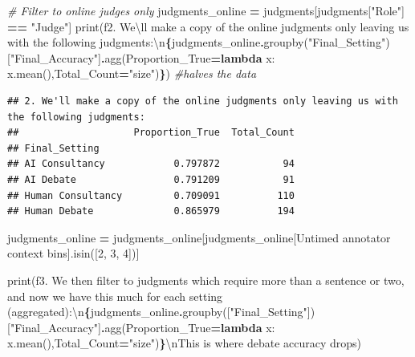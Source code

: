 \documentclass[
]{article}
\newenvironment{Shaded}{\begin{snugshade}}{\end{snugshade}}
\newcommand{\BuiltInTok}[1]{#1}
\newcommand{\CharTok}[1]{\textcolor[rgb]{0.31,0.60,0.02}{#1}}
\newcommand{\CommentTok}[1]{\textcolor[rgb]{0.56,0.35,0.01}{\textit{#1}}}
\newcommand{\KeywordTok}[1]{\textcolor[rgb]{0.13,0.29,0.53}{\textbf{#1}}}
\newcommand{\NormalTok}[1]{#1}
\newcommand{\OperatorTok}[1]{\textcolor[rgb]{0.81,0.36,0.00}{\textbf{#1}}}
\newcommand{\SpecialCharTok}[1]{\textcolor[rgb]{0.81,0.36,0.00}{\textbf{#1}}}
\newcommand{\SpecialStringTok}[1]{\textcolor[rgb]{0.31,0.60,0.02}{#1}}
\newcommand{\StringTok}[1]{\textcolor[rgb]{0.31,0.60,0.02}{#1}}
\begin{document}
\begin{Shaded}
\begin{Highlighting}[]
\CommentTok{\# Filter to online judges only}
\NormalTok{judgments\_online }\OperatorTok{=}\NormalTok{ judgments[judgments[}\StringTok{"Role"}\NormalTok{] }\OperatorTok{==} \StringTok{"Judge"}\NormalTok{]}
\BuiltInTok{print}\NormalTok{(}\SpecialStringTok{f\textquotesingle{}2. We}\CharTok{\textbackslash{}\textquotesingle{}}\SpecialStringTok{ll make a copy of the online judgments only leaving us with the following judgments:}\CharTok{\textbackslash{}n}\SpecialCharTok{\{}\NormalTok{judgments\_online}\SpecialCharTok{.}\NormalTok{groupby(}\StringTok{"Final\_Setting"}\NormalTok{)[}\StringTok{"Final\_Accuracy"}\NormalTok{]}\SpecialCharTok{.}\NormalTok{agg(Proportion\_True}\OperatorTok{=}\KeywordTok{lambda}\NormalTok{ x: x.mean(),Total\_Count}\OperatorTok{=}\StringTok{"size"}\NormalTok{)}\SpecialCharTok{\}}\SpecialStringTok{\textquotesingle{}}\NormalTok{) }\CommentTok{\#halves the data}
\end{Highlighting}
\end{Shaded}

\begin{verbatim}
## 2. We'll make a copy of the online judgments only leaving us with the following judgments:
##                    Proportion_True  Total_Count
## Final_Setting                                  
## AI Consultancy            0.797872           94
## AI Debate                 0.791209           91
## Human Consultancy         0.709091          110
## Human Debate              0.865979          194
\end{verbatim}

\begin{Shaded}
\begin{Highlighting}[]
\NormalTok{judgments\_online }\OperatorTok{=}\NormalTok{ judgments\_online[judgments\_online[}\StringTok{\textquotesingle{}Untimed annotator context bins\textquotesingle{}}\NormalTok{].isin([}\StringTok{\textquotesingle{}2\textquotesingle{}}\NormalTok{, }\StringTok{\textquotesingle{}3\textquotesingle{}}\NormalTok{, }\StringTok{\textquotesingle{}4\textquotesingle{}}\NormalTok{])]}

\BuiltInTok{print}\NormalTok{(}\SpecialStringTok{f\textquotesingle{}3. We then filter to judgments which require more than a sentence or two, and now we have this much for each setting (aggregated):}\CharTok{\textbackslash{}n}\SpecialCharTok{\{}\NormalTok{judgments\_online}\SpecialCharTok{.}\NormalTok{groupby([}\StringTok{"Final\_Setting"}\NormalTok{])[}\StringTok{"Final\_Accuracy"}\NormalTok{]}\SpecialCharTok{.}\NormalTok{agg(Proportion\_True}\OperatorTok{=}\KeywordTok{lambda}\NormalTok{ x: x.mean(),Total\_Count}\OperatorTok{=}\StringTok{"size"}\NormalTok{)}\SpecialCharTok{\}}\CharTok{\textbackslash{}n}\SpecialStringTok{This is where debate accuracy drops\textquotesingle{}}\NormalTok{)}
\end{Highlighting}
\end{Shaded}
\end{document}
